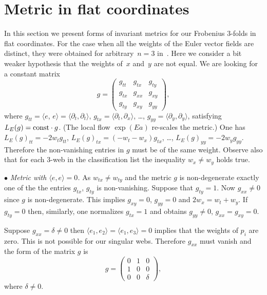 \section{Metric in f\/lat coordinates}
In this section we present forms of invariant metrics for our Frobenius $3$-folds in f\/lat coordinates.
For the case when all the weights of the Euler vector f\/ields are distinct,
they were obtained for arbitrary~$n=3$ in~\cite{Df}.
Here we consider a bit weaker hypothesis that the weights of~$x$ and~$y$ are not equal.
We are looking for a constant matrix
\[g=
\begin{pmatrix}
g_{tt}&g_{tx}&g_{ty}\\
g_{tx}&g_{xx}&g_{xy}\\
g_{ty}&g_{xy}&g_{yy}
\end{pmatrix},
\]
where $g_{tt}=\langle e$, $e\rangle=\langle\partial_t,\partial_t\rangle$,
$g_{tx}=\langle\partial_t,\partial_x\rangle $, \dots, $g_{yy}=\langle\partial_y,\partial_y\rangle $, satisfying
$L_E(g)={\rm const}\cdot g$. (The local f\/low $\exp(Ea)$ re-scales the metric.)
One has $L_E(g)_{tt}=-2w_tg_{tt}$, $L_E(g)_{tx}=(-w_t-w_x)g_{tx}$, \dots, $L_E(g)_{yy}=-2w_yg_{yy}$.
Therefore the non-vanishing entries in $g$ must be of the same weight.
Observe also that for each $3$-web in the classif\/ication list the inequality $w_x\ne w_y$ holds true.

$\bullet$ {\it Metric with $\langle e,e\rangle=0$.}
As $w_{tx}\ne w_{ty}$ and the metric $g$ is non-degenerate exactly one of the the entries $g_{tx}$, $g_{ty}$
is non-vanishing. Suppose that $g_{ty}=1$. Now $g_{xx}\ne 0$ since $g$ is non-degenerate.
This implies $g_{xy}=0$, $g_{yy}=0$ and $2w_x=w_t+w_y$.
If $g_{ty}=0$ then, similarly, one normalizes $g_{tx}=1$ and obtains $g_{yy}\ne 0$, $g_{xx}=g_{xy}=0$.

Suppose $g_{xx}=\delta\ne 0$ then $\langle e_1,e_2\rangle =\langle e_1,e_3\rangle =0$ implies that the weights of $p_i$ are zero. This is not possible for our singular webs. Therefore $g_{xx}$ must vanish and the form of the matrix $g$ is
\begin{equation}\label{metric0}
g=
\begin{pmatrix}
0 & 1 & 0\\
1 & 0 & 0\\
0 & 0 & \delta
\end{pmatrix},
\end{equation}
where $\delta \ne 0$.

